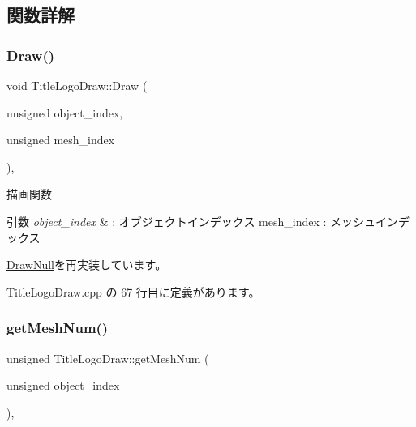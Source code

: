 \subsection{関数詳解}
\mbox{\label{class_title_logo_draw_a01e4cb21d580bac86a226fa2e35bf4a3}} 
\subsubsection{\texorpdfstring{Draw()}{Draw()}}
{\footnotesize\ttfamily void Title\+Logo\+Draw\+::\+Draw (\begin{DoxyParamCaption}\item[{unsigned}]{object\+\_\+index,  }\item[{unsigned}]{mesh\+\_\+index }\end{DoxyParamCaption})\hspace{0.3cm}{\ttfamily [override]}, {\ttfamily [virtual]}}



描画関数 


\begin{DoxyParams}{引数}
{\em object\+\_\+index} & \+: オブジェクトインデックス mesh\+\_\+index \+: メッシュインデックス \\
\hline
\end{DoxyParams}


\mbox{\hyperlink{class_draw_null_a72ac0b7dc40b1469582419dcc5b0e114}{Draw\+Null}}を再実装しています。



 Title\+Logo\+Draw.\+cpp の 67 行目に定義があります。

\mbox{\label{class_title_logo_draw_a20a0e0c3569e49eb421ab4b5a65777cd}} 
\subsubsection{\texorpdfstring{get\+Mesh\+Num()}{getMeshNum()}}
{\footnotesize\ttfamily unsigned Title\+Logo\+Draw\+::get\+Mesh\+Num (\begin{DoxyParamCaption}\item[{unsigned}]{object\+\_\+index }\end{DoxyParamCaption})\hspace{0.3cm}{\ttfamily [override]}, {\ttfamily [virtual]}}



